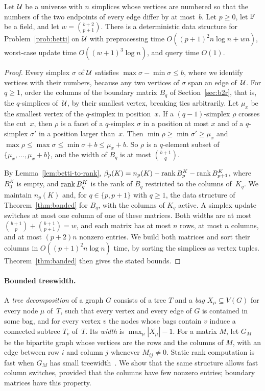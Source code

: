 \begin{corollary}\label{cor:bandwidth}
Let $\mathcal{U}$ be a universe with $n$ simplices whose vertices are numbered so that the numbers of the two endpoints of every edge differ by at most~$b$.
Let $p\ge0$, let $\mathbb{F}$ be a field, and let $w=\binom{b+2}{p+1}$.
There is a deterministic data structure for Problem~\ref{prob:betti} on $\mathcal{U}$ with preprocessing time $O((p+1)^2n\log n+wn)$, worst-case update time $O((w+1)^3\log n)$, and query time $O(1)$.
\end{corollary}

\begin{proof}
Every simplex $\sigma$ of $\mathcal{U}$ satisfies $\max\sigma-\min\sigma\le b$, where we identify vertices with their numbers, because any two vertices of $\sigma$ span an edge of~$\mathcal{U}$.
For $q\ge1$, order the columns of the boundary matrix $B_q$ of Section~\ref{sec:b2r}, that is, the $q$-simplices of~$\mathcal{U}$, by their smallest vertex, breaking ties arbitrarily.
Let $\mu_x$ be the smallest vertex of the $q$-simplex in position~$x$.
If a $(q-1)$-simplex $\rho$ crosses the cut~$x$, then $\rho$ is a facet of a $q$-simplex $\sigma$ in a position at most $x$ and of a $q$-simplex $\sigma'$ in a position larger than~$x$.
Then $\min\rho\ge\min\sigma'\ge\mu_x$ and $\max\rho\le\max\sigma\le\min\sigma+b\le\mu_x+b$.
So $\rho$ is a $q$-element subset of $\{\mu_x,\dots,\mu_x+b\}$, and the width of $B_q$ is at most $\binom{b+1}{q}$.

By Lemma~\ref{lem:betti-to-rank}, $\beta_p(K)=n_p(K)-\operatorname{rank} B_p^K-\operatorname{rank} B_{p+1}^K$, where $B_0^K$ is empty, and $\operatorname{rank} B_q^K$ is the rank of $B_q$ restricted to the columns of~$K_q$.
We maintain $n_p(K)$ and, for $q\in\{p,p+1\}$ with $q\ge1$, the data structure of Theorem~\ref{thm:banded} for $B_q$, with the columns of $K_q$ active.
A simplex update switches at most one column of one of these matrices.
Both widths are at most $\binom{b+1}{p}+\binom{b+1}{p+1}=w$, and each matrix has at most $n$ rows, at most $n$ columns, and at most $(p+2)n$ nonzero entries.
We build both matrices and sort their columns in $O((p+1)^2n\log n)$ time, by sorting the simplices as vertex tuples.
Theorem~\ref{thm:banded} then gives the stated bounds.
\end{proof}

\paragraph{Bounded treewidth.}
A \emph{tree decomposition} of a graph $G$ consists of a tree $T$ and a \emph{bag} $X_\mu\subseteq V(G)$ for every node $\mu$ of~$T$, such that every vertex and every edge of $G$ is contained in some bag, and for every vertex $v$ the nodes whose bags contain $v$ induce a connected subtree $T_v$ of~$T$.
Its \emph{width} is $\max_\mu|X_\mu|-1$.
For a matrix $M$, let $G_M$ be the bipartite graph whose vertices are the rows and the columns of $M$, with an edge between row $i$ and column $j$ whenever $M_{ij}\ne0$.
Static rank computation is fast when $G_M$ has small treewidth~\cite{FLPSW18}.
We show that the same structure allows fast column switches, provided that the columns have few nonzero entries; boundary matrices have this property.

